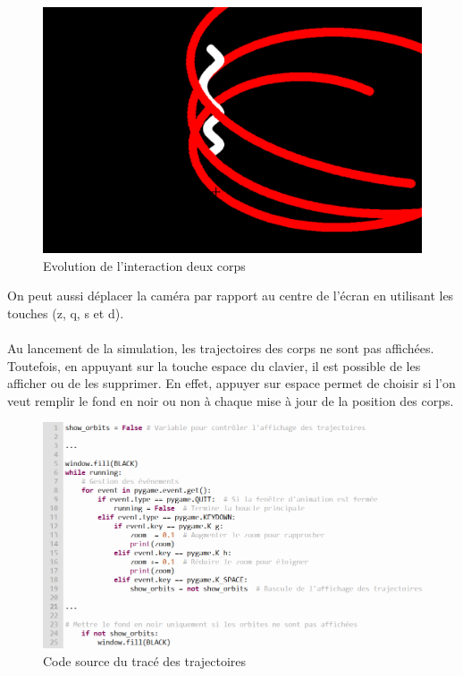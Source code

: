 \documentclass[a4paper, 12pt]{article}
\begin{document}
\begin{figure}[H]
\begin{minipage}{0.2\linewidth}
    	\end{minipage}
    	\hspace{0.05\linewidth}  %
    	\begin{minipage}{0.2\linewidth}
        	\centering
        	\includegraphics[width=\linewidth]{img/interactionDeuxCorps2.png}
        	\caption{\label{fig:DeuxCorps3} Evolution de l'interaction deux corps} 
    	\end{minipage}
	\end{figure} 

On peut aussi déplacer la caméra par rapport au centre de l'écran en utilisant les touches (z, q, s et d).
\paragraph{}
Au lancement de la simulation, les trajectoires des corps ne sont pas affichées. Toutefois, en appuyant sur la touche espace du clavier, il est possible de les afficher ou de les supprimer. En effet, appuyer sur espace permet de choisir si l'on veut remplir le fond en noir ou non à chaque mise à jour de la position des corps.

\begin{figure}[H]
		\centering
		\includegraphics[width=0.5\linewidth]{img/codeTrajectoire.png}
		\caption{\label{fig: Source} Code source du tracé des trajectoires}  
	\end{figure}
\end{document}
